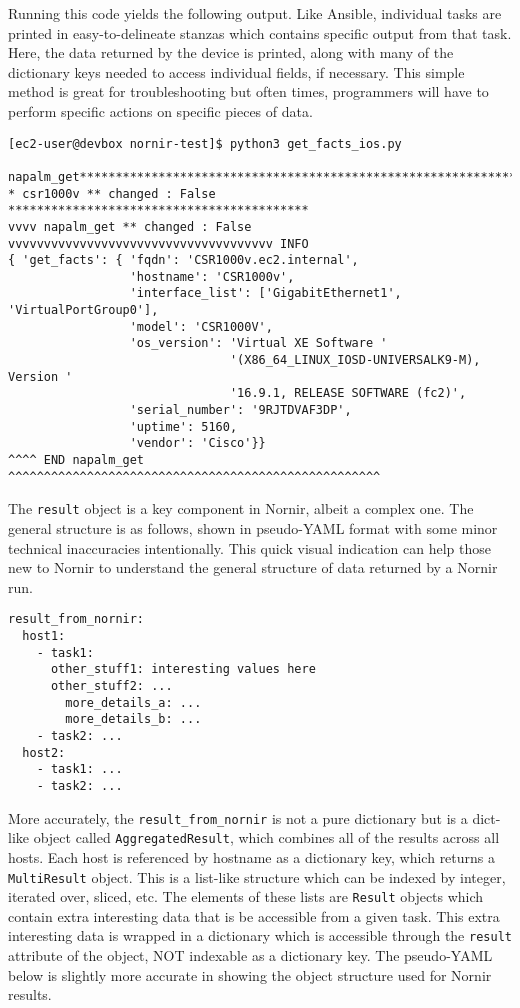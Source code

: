 Running this code yields the following output. Like Ansible, individual tasks
are printed in easy-to-delineate stanzas which contains specific output from
that task. Here, the data returned by the device is printed, along with many
of the dictionary keys needed to access individual fields, if necessary. This
simple method is great for troubleshooting but often times, programmers will
have to perform specific actions on specific pieces of data.

\begin{verbatim}
[ec2-user@devbox nornir-test]$ python3 get_facts_ios.py 

napalm_get**************************************************************
* csr1000v ** changed : False ******************************************
vvvv napalm_get ** changed : False vvvvvvvvvvvvvvvvvvvvvvvvvvvvvvvvvvvvv INFO
{ 'get_facts': { 'fqdn': 'CSR1000v.ec2.internal',
                 'hostname': 'CSR1000v',
                 'interface_list': ['GigabitEthernet1', 'VirtualPortGroup0'],
                 'model': 'CSR1000V',
                 'os_version': 'Virtual XE Software '
                               '(X86_64_LINUX_IOSD-UNIVERSALK9-M), Version '
                               '16.9.1, RELEASE SOFTWARE (fc2)',
                 'serial_number': '9RJTDVAF3DP',
                 'uptime': 5160,
                 'vendor': 'Cisco'}}
^^^^ END napalm_get ^^^^^^^^^^^^^^^^^^^^^^^^^^^^^^^^^^^^^^^^^^^^^^^^^^^^
\end{verbatim}

The \verb|result| object is a key component in Nornir, albeit a complex one.
The general structure is as follows, shown in pseudo-YAML format with some
minor technical inaccuracies intentionally. This quick visual indication can
help those new to Nornir to understand the general structure of data returned
by a Nornir run.

\begin{verbatim}
result_from_nornir:
  host1:
    - task1:
      other_stuff1: interesting values here
      other_stuff2: ...
        more_details_a: ...
        more_details_b: ...
    - task2: ...
  host2:
    - task1: ...
    - task2: ...
\end{verbatim}

More accurately, the \verb|result_from_nornir| is not a pure dictionary but is
a dict-like object called \verb|AggregatedResult|, which combines all of the
results across all hosts. Each host is referenced by hostname as a dictionary
key, which returns a \verb|MultiResult| object. This is a list-like structure
which can be indexed by integer, iterated over, sliced, etc. The elements of
these lists are \verb|Result| objects which contain extra interesting data
that is be accessible from a given task. This extra interesting data is
wrapped in a dictionary which is accessible through the \verb|result|
attribute of the object, NOT indexable as a dictionary key. The pseudo-YAML
below is slightly more accurate in showing the object structure used for
Nornir results.

